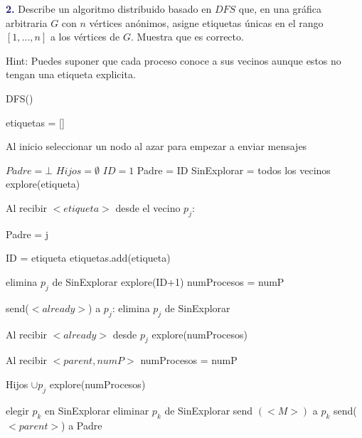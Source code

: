 \newpage
\textbf{\textcolor{MidnightBlue}{2.}}
Describe un algoritmo distribuido basado en $DFS$ que, en una gráfica arbitraria $G$ con $n$ vértices anónimos, asigne etiquetas únicas en el rango $[1, . . . , n]$ a los vértices de $G$. Muestra que es correcto.

Hint: Puedes suponer que cada proceso conoce a sus vecinos aunque estos no tengan una etiqueta explicita.

\begin{algorithm}
    \caption{DFS()}
    \begin{algorithmic}[1]
    
    \State etiquetas = []

    \State Al inicio seleccionar un nodo al azar para empezar a enviar mensajes
    
    \State $Padre = \bot$
    \State $Hijos = \emptyset$
    \State $ID = 1$
    \State Padre = ID
    \State SinExplorar = todos los vecinos
    \State explore(etiqueta)


    \State Al recibir $<etiqueta>$ desde el vecino $p_j$:
    
        \State Padre = j

        \State ID = etiqueta 
        \State etiquetas.add(etiqueta)

        \State elimina $p_j$ de SinExplorar
        \State explore(ID+1)
    \Else
            \State numProcesos = numP
        \EndIf
    
        \State send($<already>$) a $p_j$:
        \State elimina $p_j$ de SinExplorar
    \EndIf
    
    \State Al recibir $<already>$ desde $p_j$
        \State explore(numProcesos)
    
    \State Al recibir $<parent,numP>$
            \State numProcesos = numP
        \EndIf
    
        \State Hijos $\cup {p_j}$
        \State explore(numProcesos)
    
    
            \State elegir $p_k$ en SinExplorar
            \State eliminar $p_k$ de SinExplorar
            \State send $(<M>)$ a $p_k$
        \Else
                \State send($<parent>$) a Padre
            \EndIf
        \EndIf
    \EndProcedure
    \end{algorithmic}
    \end{algorithm}
    